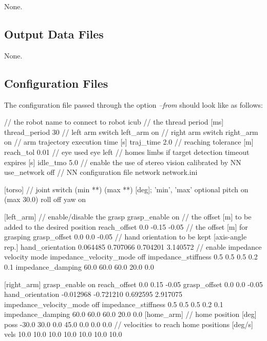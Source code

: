 None.\hypertarget{group__icub__pf3dTracker_out_data_sec}{}\subsection{Output Data Files}\label{group__icub__pf3dTracker_out_data_sec}
None. \hypertarget{group__src__demoYoga_conf_file_sec}{}\subsection{Configuration Files}\label{group__src__demoYoga_conf_file_sec}
The configuration file passed through the option {\itshape --from} should look like as follows\+: 
\begin{DoxyCode}
[general]
\textcolor{comment}{// the robot name to connect to}
robot           icub
\textcolor{comment}{// the thread period [ms]}
thread\_period   30
\textcolor{comment}{// left arm switch}
left\_arm        on
\textcolor{comment}{// right arm switch}
right\_arm       on
\textcolor{comment}{// arm trajectory execution time [s]}
traj\_time       2.0
\textcolor{comment}{// reaching tolerance [m]}
reach\_tol       0.01
\textcolor{comment}{// eye used}
eye             left
\textcolor{comment}{// homes limbs if target detection timeout expires [s]}
idle\_tmo        5.0
\textcolor{comment}{// enable the use of stereo vision calibrated by NN}
use\_network off
\textcolor{comment}{// NN configuration file}
network         network.ini

[torso]
\textcolor{comment}{// joint switch (min **) (max **) [deg]; 'min', 'max' optional}
pitch on  (max 30.0)
roll off
yaw on

[left\_arm]
\textcolor{comment}{// enable/disable the grasp}
grasp\_enable        on
\textcolor{comment}{// the offset [m] to be added to the desired position}
reach\_offset        0.0 -0.15 -0.05
\textcolor{comment}{// the offset [m] for grasping}
grasp\_offset        0.0 0.0 -0.05
\textcolor{comment}{// hand orientation to be kept [axis-angle rep.]}
hand\_orientation 0.064485 0.707066 0.704201 3.140572
\textcolor{comment}{// enable impedance velocity mode}
impedance\_velocity\_mode off
impedance\_stiffness 0.5 0.5 0.5 0.2 0.1
impedance\_damping 60.0 60.0 60.0 20.0 0.0

[right\_arm]
grasp\_enable        on
reach\_offset        0.0 0.15 -0.05
grasp\_offset        0.0 0.0 -0.05
hand\_orientation    -0.012968 -0.721210 0.692595 2.917075
impedance\_velocity\_mode off
impedance\_stiffness 0.5 0.5 0.5 0.2 0.1
impedance\_damping 60.0 60.0 60.0 20.0 0.0
[home\_arm]
\textcolor{comment}{// home position [deg]}
poss    -30.0 30.0 0.0  45.0 0.0  0.0  0.0
\textcolor{comment}{// velocities to reach home positions [deg/s]}
vels    10.0  10.0 10.0 10.0 10.0 10.0 10.0


\end{DoxyCode}
